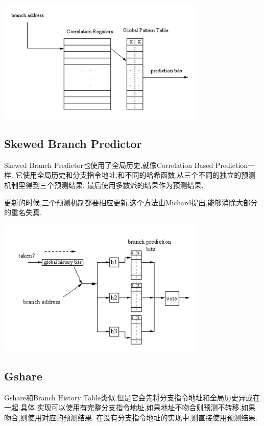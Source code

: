 \documentclass[adobefonts, nocap]{ctexart}
\begin{document}
      \begin{center}
        \includegraphics[width=10cm]{8.png}
      \end{center}
    \subsection{Skewed Branch Predictor}
      Skewed Branch Predictor也使用了全局历史,就像Correlation Based Prediction一样.
      它使用全局历史和分支指令地址,和不同的哈希函数,从三个不同的独立的预测机制里得到三个预测结果.
      最后使用多数派的结果作为预测结果.

      更新的时候,三个预测机制都要相应更新.这个方法由Michard提出,能够消除大部分的重名失真.

      \begin{center}
        \includegraphics[width=10cm]{9.png}
      \end{center}
    \subsection{Gshare}
      Gshare和Branch History Table类似,但是它会先将分支指令地址和全局历史异或在一起.具体
      实现可以使用有完整分支指令地址,如果地址不吻合则预测不转移.如果吻合,则使用对应的预测结果.
      在没有分支指令地址的实现中,则直接使用预测结果.
\end{document}
